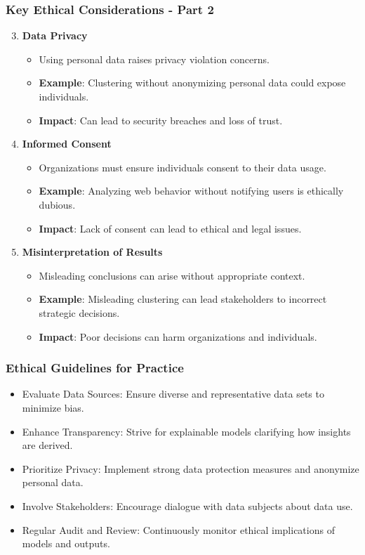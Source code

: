 \documentclass[aspectratio=169]{beamer}
\begin{document}
\begin{frame}[fragile]
  \frametitle{Key Ethical Considerations - Part 2}
  \begin{enumerate}
    \setcounter{enumi}{2} %
    \item \textbf{Data Privacy}
      \begin{itemize}
        \item Using personal data raises privacy violation concerns.
        \item \textbf{Example}: Clustering without anonymizing personal data could expose individuals.
        \item \textbf{Impact}: Can lead to security breaches and loss of trust.
      \end{itemize}

    \item \textbf{Informed Consent}
      \begin{itemize}
        \item Organizations must ensure individuals consent to their data usage.
        \item \textbf{Example}: Analyzing web behavior without notifying users is ethically dubious.
        \item \textbf{Impact}: Lack of consent can lead to ethical and legal issues.
      \end{itemize}

    \item \textbf{Misinterpretation of Results}
      \begin{itemize}
        \item Misleading conclusions can arise without appropriate context.
        \item \textbf{Example}: Misleading clustering can lead stakeholders to incorrect strategic decisions.
        \item \textbf{Impact}: Poor decisions can harm organizations and individuals.
      \end{itemize}
  \end{enumerate}
\end{frame}

\begin{frame}[fragile]
  \frametitle{Ethical Guidelines for Practice}
  \begin{itemize}
    \item Evaluate Data Sources: Ensure diverse and representative data sets to minimize bias.
    \item Enhance Transparency: Strive for explainable models clarifying how insights are derived.
    \item Prioritize Privacy: Implement strong data protection measures and anonymize personal data.
    \item Involve Stakeholders: Encourage dialogue with data subjects about data use.
    \item Regular Audit and Review: Continuously monitor ethical implications of models and outputs.
  \end{itemize}
\end{frame}
\end{document}

